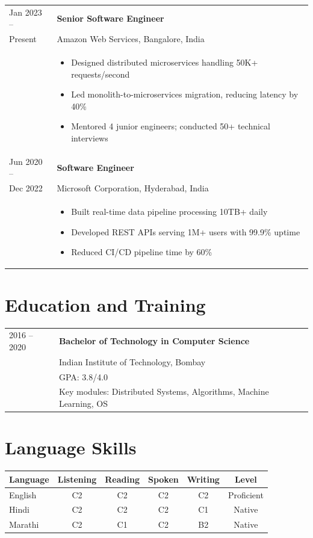 \documentclass[10pt,a4paper]{article}
\begin{document}
\noindent\begin{tabularx}{\textwidth}{@{}p{2.2cm}|X@{}}
Jan 2023 -- & \textbf{Senior Software Engineer}\\
Present & Amazon Web Services, Bangalore, India\\
& \begin{itemize}[leftmargin=*, itemsep=0pt, topsep=2pt]
  \item \small Designed distributed microservices handling 50K+ requests/second
  \item \small Led monolith-to-microservices migration, reducing latency by 40\%
  \item \small Mentored 4 junior engineers; conducted 50+ technical interviews
\end{itemize}\\[4pt]

Jun 2020 -- & \textbf{Software Engineer}\\
Dec 2022 & Microsoft Corporation, Hyderabad, India\\
& \begin{itemize}[leftmargin=*, itemsep=0pt, topsep=2pt]
  \item \small Built real-time data pipeline processing 10TB+ daily
  \item \small Developed REST APIs serving 1M+ users with 99.9\% uptime
  \item \small Reduced CI/CD pipeline time by 60\%
\end{itemize}
\end{tabularx}

\section{Education and Training}

\noindent\begin{tabularx}{\textwidth}{@{}p{2.2cm}|X@{}}
2016 -- 2020 & \textbf{Bachelor of Technology in Computer Science}\\
& Indian Institute of Technology, Bombay\\
& GPA: 3.8/4.0\\
& Key modules: Distributed Systems, Algorithms, Machine Learning, OS
\end{tabularx}

\section{Language Skills}

\begin{center}
\begin{tabular}{|l|c|c|c|c|c|}
\hline
\textbf{Language} & \textbf{Listening} & \textbf{Reading} & \textbf{Spoken} & \textbf{Writing} & \textbf{Level}\\
\hline
English & C2 & C2 & C2 & C2 & Proficient\\
\hline
Hindi & C2 & C2 & C2 & C1 & Native\\
\hline
Marathi & C2 & C1 & C2 & B2 & Native\\
\hline
\end{tabular}
\end{center}
\end{document}

